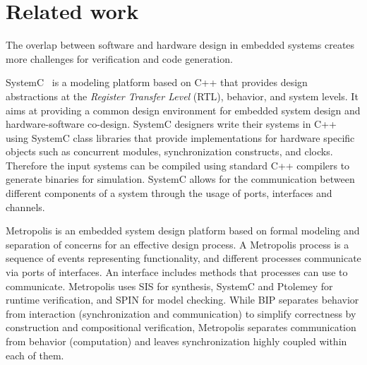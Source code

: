 
\section{Related work}
\label{sec:related}

The overlap between software and hardware design in embedded systems creates more challenges 
for verification and code generation. 

SystemC~\cite{systemc} is a modeling platform based on C++ that provides
design abstractions at the {\em Register Transfer Level} (RTL), behavior, and system levels. 
It aims at providing a common design environment for embedded system design and hardware-software
co-design. SystemC designers write their systems in C++ using SystemC class libraries that 
provide implementations for hardware specific objects such as concurrent modules, synchronization constructs,
and clocks.
Therefore the input systems can be compiled using standard C++ compilers to generate binaries
for simulation. SystemC allows for the communication between different components of a system
through the usage of ports, interfaces and channels.  

Metropolis\cite{metropolis1,metropolis2} is an embedded system design platform based on 
formal modeling and separation of concerns for an effective
design process.%
A Metropolis process is a sequence of events representing
functionality, and different processes communicate via ports of interfaces.%
An interface includes methods that processes can use to communicate. 
Metropolis uses SIS for synthesis, SystemC and Ptolemey for runtime verification, and SPIN for model checking.
While BIP separates behavior from interaction (synchronization and communication) to simplify correctness by construction
and compositional verification, Metropolis separates communication from behavior (computation) and leaves synchronization 
highly coupled within each of them. 


